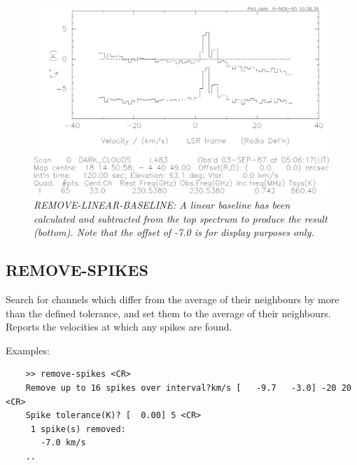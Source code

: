 \documentclass[11pt,twoside]{report}
\begin{document}
\begin{figure}[htbp]
\begin{center}
\includegraphics[scale=0.65]{r-l-b.ps}
\protect\parbox{5.5in}
{\caption[RLB]
{\sl
REMOVE-LINEAR-BASELINE: A linear baseline has been calculated and subtracted
from the top spectrum to produce the result (bottom). Note that the offset
of -7.0 is for display purposes only.
\label{RLB}
}
}
\end{center}
\end{figure}

\subsection{REMOVE-SPIKES} 

Search for channels which differ from the average of their neighbours by
more than the defined tolerance, and set them to the average of their
neighbours. Reports the velocities at which any spikes are found.

Examples:
\begin{verbatim}
    >> remove-spikes <CR>
    Remove up to 16 spikes over interval?km/s [   -9.7   -3.0] -20 20 <CR>
    Spike tolerance(K)? [  0.00] 5 <CR>
     1 spike(s) removed:
       -7.0 km/s    
    ..
\end{verbatim}
\end{document}
